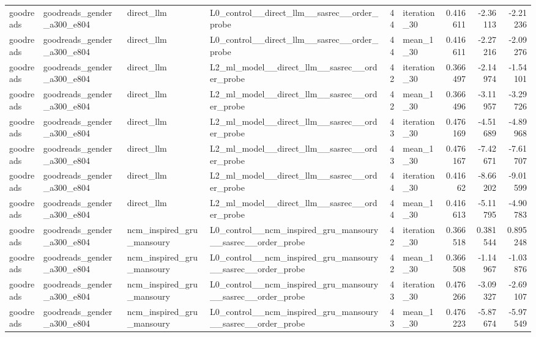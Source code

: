 \begin{table}[htbp!]
\begin{tabular}{llllrlrrr}
goodreads & goodreads\_gender\_a300\_e804 & direct\_llm & L0\_control\_\_direct\_llm\_\_sasrec\_\_order\_probe & 44 & iteration\_30 & 0.416611 & -2.36113 & -2.21236 \\
goodreads & goodreads\_gender\_a300\_e804 & direct\_llm & L0\_control\_\_direct\_llm\_\_sasrec\_\_order\_probe & 44 & mean\_1\_30 & 0.416611 & -2.27216 & -2.09276 \\
goodreads & goodreads\_gender\_a300\_e804 & direct\_llm & L2\_ml\_model\_\_direct\_llm\_\_sasrec\_\_order\_probe & 42 & iteration\_30 & 0.366497 & -2.14974 & -1.54101 \\
goodreads & goodreads\_gender\_a300\_e804 & direct\_llm & L2\_ml\_model\_\_direct\_llm\_\_sasrec\_\_order\_probe & 42 & mean\_1\_30 & 0.366496 & -3.11957 & -3.29726 \\
goodreads & goodreads\_gender\_a300\_e804 & direct\_llm & L2\_ml\_model\_\_direct\_llm\_\_sasrec\_\_order\_probe & 43 & iteration\_30 & 0.476169 & -4.51689 & -4.89968 \\
goodreads & goodreads\_gender\_a300\_e804 & direct\_llm & L2\_ml\_model\_\_direct\_llm\_\_sasrec\_\_order\_probe & 43 & mean\_1\_30 & 0.476167 & -7.42671 & -7.61707 \\
goodreads & goodreads\_gender\_a300\_e804 & direct\_llm & L2\_ml\_model\_\_direct\_llm\_\_sasrec\_\_order\_probe & 44 & iteration\_30 & 0.41662 & -8.66202 & -9.01599 \\
goodreads & goodreads\_gender\_a300\_e804 & direct\_llm & L2\_ml\_model\_\_direct\_llm\_\_sasrec\_\_order\_probe & 44 & mean\_1\_30 & 0.416613 & -5.11795 & -4.90783 \\
goodreads & goodreads\_gender\_a300\_e804 & ncm\_inspired\_gru\_mansoury & L0\_control\_\_ncm\_inspired\_gru\_mansoury\_\_sasrec\_\_order\_probe & 42 & iteration\_30 & 0.366518 & 0.381544 & 0.895248 \\
goodreads & goodreads\_gender\_a300\_e804 & ncm\_inspired\_gru\_mansoury & L0\_control\_\_ncm\_inspired\_gru\_mansoury\_\_sasrec\_\_order\_probe & 42 & mean\_1\_30 & 0.366508 & -1.14967 & -1.03876 \\
goodreads & goodreads\_gender\_a300\_e804 & ncm\_inspired\_gru\_mansoury & L0\_control\_\_ncm\_inspired\_gru\_mansoury\_\_sasrec\_\_order\_probe & 43 & iteration\_30 & 0.476266 & -3.09327 & -2.69107 \\
goodreads & goodreads\_gender\_a300\_e804 & ncm\_inspired\_gru\_mansoury & L0\_control\_\_ncm\_inspired\_gru\_mansoury\_\_sasrec\_\_order\_probe & 43 & mean\_1\_30 & 0.476223 & -5.87674 & -5.97549 \\

\end{tabular}
\end{table}
